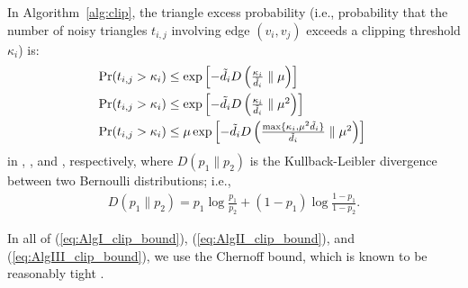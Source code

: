 \begin{theorem}\label{thm:triangle_excess}
In Algorithm~\ref{alg:clip}, the triangle excess probability (i.e., probability that the number of noisy triangles $t_{i,j}$ involving edge $(v_i, v_j)$ exceeds a clipping threshold $\kappa_i$) is:
  \begin{align}
    \hspace{-1mm} \Pr(t_{i,j} > \kappa_i) &\leq \textstyle{\exp \left[-\tilde{d}_i D \left(\frac{\kappa_i}{\tilde{d}_i} \parallel \mu \right) \right]} \label{eq:AlgI_clip_bound} \\
    \hspace{-1mm} \Pr(t_{i,j} > \kappa_i) &\leq \textstyle{\exp \left[-\tilde{d}_i D \left(\frac{\kappa_i}{\tilde{d}_i} \parallel \mu^2 \right) \right]} \label{eq:AlgII_clip_bound}\\
    \hspace{-1mm} \Pr(t_{i,j} > \kappa_i) &\leq 
    \textstyle{\mu \exp \left[-\tilde{d}_i D \left(\frac{\max\{\kappa_i,\mu^2 \tilde{d}_i\}}{\tilde{d}_i} \parallel \mu^2 \right) \right]}
    \label{eq:AlgIII_clip_bound}
  \end{align}
  in \AlgOne{}, \AlgTwo{}, and \AlgThree{}, respectively, 
  where 
  $D(p_1 \parallel p_2)$ is the Kullback-Leibler divergence between two Bernoulli distributions; i.e., 
\begin{align*}
    \textstyle{D(p_1 \parallel p_2) = p_1 \log \frac{p_1}{p_2} + (1-p_1) \log \frac{1-p_1}{1-p_2}.}
\end{align*}
\end{theorem}
In all of (\ref{eq:AlgI_clip_bound}), (\ref{eq:AlgII_clip_bound}), and (\ref{eq:AlgIII_clip_bound}), we use the Chernoff bound, which is known to be reasonably tight \cite{Arratia_BMB89}. 


